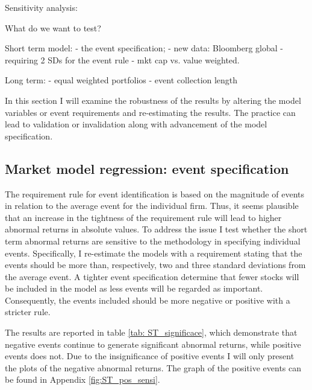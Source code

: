 Sensitivity analysis:

What do we want to test?

Short term model:
- the event specification; 
        - new data: Bloomberg global
        - requiring 2 SDs for the event rule
        - mkt cap vs. value weighted. 

Long term:
- equal weighted portfolios
- event collection length


In this section I will examine the robustness of the results by altering the model variables or event requirements and re-estimating the results. The practice can lead to validation or invalidation along with advancement of the model specification.  

\subsection{Market model regression: event specification}
The requirement rule for event identification is based on the magnitude of events in relation to the average event for the individual firm. Thus, it seems plausible that an increase in the tightness of the requirement rule will lead to higher abnormal returns in absolute values.  
To address the issue I test whether the short term abnormal returns are sensitive to the methodology in specifying individual events. Specifically, I re-estimate the models with a requirement stating that the events should be more than, respectively, two and three standard deviations from the average event. A tighter event specification determine that fewer stocks will be included in the model as less events will be regarded as important. Consequently, the events included should be more negative or positive with a stricter rule. 

The results are reported in table \ref{tab: ST_significace}, which demonstrate that negative events continue to generate significant abnormal returns, while positive events does not. Due to the insignificance of positive events I will only present the plots of the negative abnormal returns. The graph of the positive events can be found in Appendix \ref{fig:ST_pos_sensi}. 


